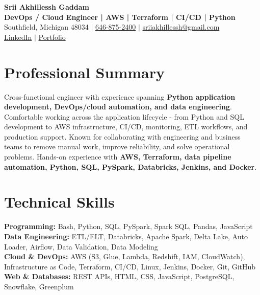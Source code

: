 \documentclass[letterpaper,10pt]{article}
\begin{document}
\fontsize{9.35pt}{10.45pt}\selectfont

\begin{center}
    {\LARGE \textbf{Srii Akhillessh Gaddam}} \\[-1pt]
    \textbf{DevOps / Cloud Engineer | AWS | Terraform | CI/CD | Python} \\[2pt]
    Southfield, Michigan 48034 $|$
    \href{tel:6468752400}{646-875-2400} $|$
    \href{mailto:sriiakhillessh@gmail.com}{sriiakhillessh@gmail.com} \\[1pt]
    \href{https://www.linkedin.com/in/srii-akhiilessh-gaddam-b48668191/}{LinkedIn} $|$
    \href{https://sriiakhillesshg.github.io/portfolio/}{Portfolio}
\end{center}
\vspace{-8pt}

\section{Professional Summary}
\small{Cross-functional engineer with experience spanning \textbf{Python application development, DevOps/cloud automation, and data engineering}. Comfortable working across the application lifecycle - from Python and SQL development to AWS infrastructure, CI/CD, monitoring, ETL workflows, and production support. Known for collaborating with engineering and business teams to remove manual work, improve reliability, and solve operational problems. Hands-on experience with \textbf{AWS, Terraform, data pipeline automation, Python, SQL, PySpark, Databricks, Jenkins, and Docker}.}

\section{Technical Skills}
\small{
\textbf{Programming:} Bash, Python, SQL, PySpark, Spark SQL, Pandas, JavaScript \\
\textbf{Data Engineering:} ETL/ELT, Databricks, Apache Spark, Delta Lake, Auto Loader, Airflow, Data Validation, Data Modeling \\
\textbf{Cloud \& DevOps:} AWS (S3, Glue, Lambda, Redshift, IAM, CloudWatch), Infrastructure as Code, Terraform, CI/CD, Linux, Jenkins, Docker, Git, GitHub \\
\textbf{Web \& Databases:} REST APIs, HTML, CSS, JavaScript, PostgreSQL, Snowflake, Greenplum
}
\end{document}
